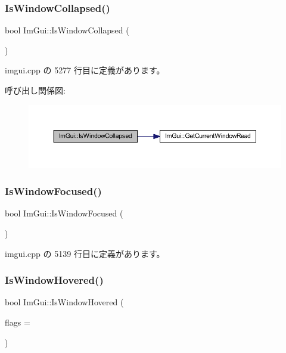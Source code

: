 \subsubsection{\texorpdfstring{Is\+Window\+Collapsed()}{IsWindowCollapsed()}}
{\footnotesize\ttfamily bool Im\+Gui\+::\+Is\+Window\+Collapsed (\begin{DoxyParamCaption}{ }\end{DoxyParamCaption})}



 imgui.\+cpp の 5277 行目に定義があります。

呼び出し関係図\+:\nopagebreak
\begin{figure}[H]
\begin{center}
\leavevmode
\includegraphics[width=350pt]{namespace_im_gui_a2a6492aea9013c0078fc530a66e11768_cgraph}
\end{center}
\end{figure}
\mbox{\label{namespace_im_gui_a1bc0d66039324e071c7d1ae20f9b1211}} 
\subsubsection{\texorpdfstring{Is\+Window\+Focused()}{IsWindowFocused()}}
{\footnotesize\ttfamily bool Im\+Gui\+::\+Is\+Window\+Focused (\begin{DoxyParamCaption}{ }\end{DoxyParamCaption})}



 imgui.\+cpp の 5139 行目に定義があります。

\mbox{\label{namespace_im_gui_aaed1ebf40cc2cb2ec30b0ba39b91d4a5}} 
\subsubsection{\texorpdfstring{Is\+Window\+Hovered()}{IsWindowHovered()}}
{\footnotesize\ttfamily bool Im\+Gui\+::\+Is\+Window\+Hovered (\begin{DoxyParamCaption}\item[{\mbox{\hyperlink{imgui_8h_a3a8f688665e5ea0bd9700e1251580a2c}{Im\+Gui\+Hovered\+Flags}}}]{flags = {} }\end{DoxyParamCaption})}



